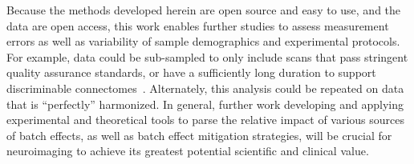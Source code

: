 \documentclass[11pt]{article}
\begin{document}
Because the methods developed herein are open source and easy to use, and the data are open access, this work enables further studies to assess measurement errors as well as variability of sample demographics and experimental protocols. For example, data could be sub-sampled to only include scans that pass stringent quality assurance standards, or have a sufficiently long duration to support discriminable connectomes~\cite{Airan17}.
 Alternately, this analysis could be repeated on data that is ``perfectly'' harmonized. In general, further work developing and applying experimental and theoretical tools to parse the relative impact of various sources of batch effects, as well as batch effect mitigation strategies, will be crucial for neuroimaging to achieve its greatest potential scientific and clinical value. 




\end{document}
